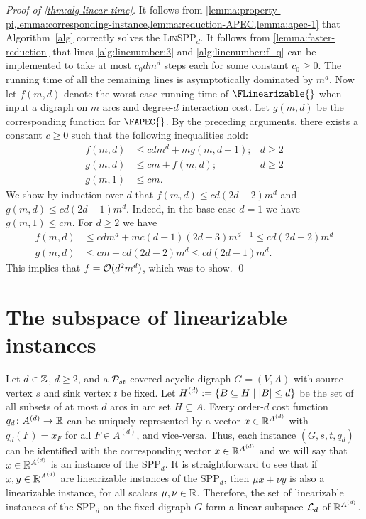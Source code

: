 \begin{proof}[Proof of \cref{thm:alg-linear-time}]
It follows from \cref{lemma:property-pi,lemma:corresponding-instance,lemma:reduction-APEC,lemma:apec-1} that Algorithm~\ref{alg} correctly solves the \textsc{Lin}SPP$_d$. It follows from \cref{lemma:faster-reduction} that lines \ref{alg:linenumber:3} and \ref{alg:linenumber:f_q} can be implemented to take at most $c_0dm^d$ steps each for some constant $c_0 \geq 0$. The running time of all the remaining lines is asymptotically dominated by $m^d$. Now let $f(m, d)$ denote the worst-case running time of $\FLinearizable{}$ when input a digraph on $m$ arcs and degree-$d$ interaction cost. Let $g(m, d)$ be the corresponding function for $\FAPEC{}$. By the preceding arguments, there exists a constant $c \geq 0$ such that the following inequalities hold:
\begin{align*}
    f(m ,d) &\leq cdm^d + mg(m, d-1); & d \geq 2\\
    g(m, d) &\leq cm + f(m, d); & d \geq 2\\
    g(m, 1) &\leq cm.
\end{align*}
We show by induction over $d$ that $f(m, d) \leq cd(2d - 2)m^d$ and $g(m, d) \leq cd(2d - 1)m^d$. Indeed, in the base case $d = 1$ we have $g(m, 1) \leq cm$. For $d \geq 2$ we have 
\begin{align*}
    f(m, d) &\leq cdm^d + mc(d-1)(2d - 3)m^{d-1} \leq cd(2d - 2)m^d \\
    g(m, d) &\leq cm + cd(2d - 2)m^d \leq cd(2d -1)m^d. 
\end{align*}
This implies that $f = \mathcal{O}(d^2m^d)$, which was to show.
\qed
\end{proof}

\section{The subspace of linearizable instances}
\label{sec:subspace}

Let $d\in \mathbb{Z}$, $d\ge 2$, and a $\mathcal{P}_{st}$-covered acyclic digraph  $G = (V, A)$ with source vertex $s$ and sink vertex $t$  be  fixed. 
Let $H^{(d)} := \{ B \subseteq H \mid |B| \leq d \}$ be the set of all subsets of at most $d$ arcs in arc set $H\subseteq A$.
Every order-$d$ cost function $q_d\colon A^{(d)}\to \mathbb{R}$ can be uniquely represented by a vector $x \in \mathbb{R}^{A^{(d)}}$ with $q_d(F)=x_F$ for all $F\in A^{(d)}$, and vice-versa. Thus, each instance $(G,s,t,q_d)$ can be identified with the corresponding vector $x\in \mathbb{R}^{A^{(d)}}$ and we will say that $x\in \mathbb{R}^{A^{(d)}}$ is an instance of the SPP$_d$. 
It is straightforward to see that if $x,y \in \mathbb{R}^{A^{(d)}}$ are linearizable instances of the SPP$_d$, then $\mu x + \nu y$ is also a linearizable instance, for all scalars $\mu,\nu \in \mathbb{R}$.
Therefore, the set of linearizable instances of the SPP$_d$ on the fixed digraph  $G$ form a linear subspace ${\cal L}_d$ of $\mathbb{R}^{A^{(d)}}$. 

